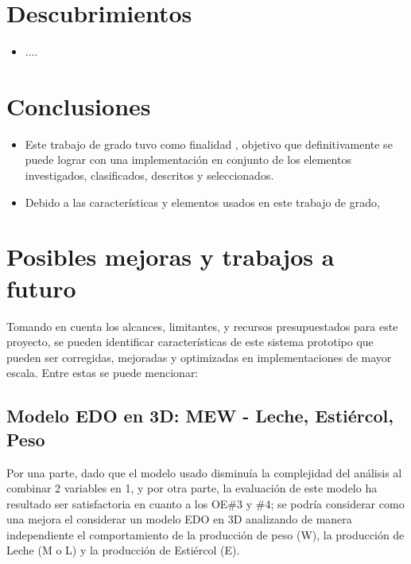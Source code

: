 \section{Descubrimientos}
\begin{itemize}
    \item ....
\end{itemize}
\section{Conclusiones}
\begin{itemize}
    \item Este trabajo de grado tuvo como finalidad , objetivo que definitivamente se puede lograr con una implementación en conjunto de los elementos investigados, clasificados, descritos y seleccionados.
    
    \item Debido a las características y elementos usados en este trabajo de grado, 
\end{itemize}



\section{Posibles mejoras y trabajos a futuro}

Tomando en cuenta los alcances, limitantes, y recursos presupuestados para este proyecto, se pueden identificar características de este sistema prototipo que pueden ser corregidas, mejoradas y optimizadas en implementaciones de mayor escala. Entre estas se puede mencionar:

\subsection{Modelo EDO en 3D: MEW - Leche, Estiércol, Peso}

Por una parte, dado que el modelo usado disminuía la complejidad del análisis al combinar 2 variables en 1, y por otra parte, la evaluación de este modelo ha resultado ser satisfactoria en cuanto a los OE\#3 y \#4; se podría considerar como una mejora el considerar un modelo EDO en 3D analizando de manera independiente el comportamiento de la producción de peso (W), la producción de Leche (M o L) y la producción de Estiércol (E).

